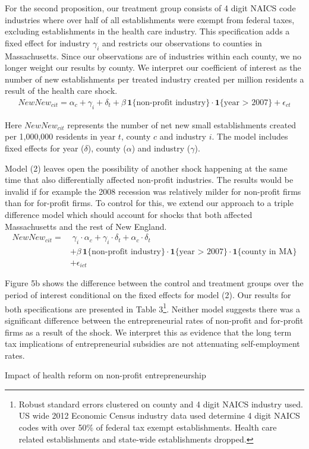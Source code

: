 \documentclass[12pt]{article}
\begin{document}
For the second proposition, our treatment group consists of 4 digit NAICS code industries where over half of all establishments were exempt from federal taxes, excluding establishments in the health care industry. This specification adds a fixed effect for industry $\gamma_i$ and restricts our observations to counties in Massachusetts. Since our observations are of industries within each county, we no longer weight our results by county. We interpret our coefficient of interest as the number of new establishments per treated industry created per million residents a result of the health care shock. 
\begin{align}
NewNew_{cit} = \alpha_c + \gamma_i + \delta_t + \beta \, \mathbf{1}\{\text{non-profit industry}\} \cdot \mathbf{1}\{\text{year > 2007}\} + \epsilon_{ct}
\end{align}

Here $NewNew_{cit}$ represents the number of net new small establishments created per 1,000,000 residents in year $t$, county $c$ and industry $i$. The model includes fixed effects for year ($\delta$), county ($\alpha$) and industry ($\gamma$). 

Model (2) leaves open the possibility of another shock happening at the same time that also differentially affected non-profit industries. The results would be invalid if for example the 2008 recession was relatively milder for non-profit firms than for for-profit firms. To control for this, we extend our approach to a triple difference model which should account for shocks that both affected Massachusetts and the rest of New England. 
\begin{align}
NewNew_{cit} = & \; \gamma_i \cdot \alpha_c + \gamma_i \cdot \delta_t +  \alpha_c \cdot \delta_t \nonumber   \\
& + \beta \, \mathbf{1}\{\text{non-profit industry}\} \cdot \mathbf{1}\{\text{year > 2007}\}  \cdot \mathbf{1}\{\text{county in  MA}\} \nonumber  \\
& + \epsilon_{ict}
\end{align}

Figure 5b shows the difference between the control and treatment groups over the period of interest conditional on the fixed effects for model (2). Our results for both specifications are presented in Table 3\footnote{Robust standard errors clustered on county and 4 digit NAICS industry used. US wide 2012 Economic Census industry data used determine 4 digit NAICS codes with over 50\% of federal tax exempt establishments. Health care related establishments and state-wide establishments dropped.}. Neither model suggests there was a significant difference between the entrepreneurial rates of non-profit and for-profit firms as a result of the shock. We interpret this as evidence that the long term tax implications of entrepreneurial subsidies are not attenuating self-employment rates. 
\begin{center}
	\begin{table}[H]
		\centering
		
		\caption{Impact of health reform on non-profit entrepreneurship}
	\end{table}
\end{center}
\end{document}
